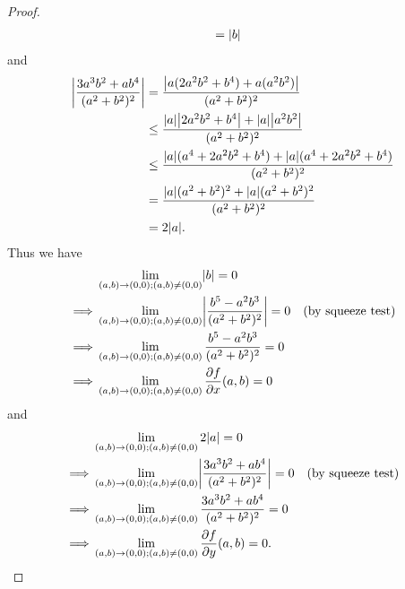 \begin{proof}
\begin{align*}
                                                  & = \left\lvert b\right\rvert
    \end{align*}
    and
    \begin{align*}
        \abs{\frac{3 a^3 b^2 + a b^4}{(a^2 + b^2)^2}} & = \frac{\abs{a (2 a^2 b^2 + b^4) + a (a^2 b^2)}}{(a^2 + b^2)^2}                              \\
                                                      & \leq \frac{\abs{a} \abs{2 a^2 b^2 + b^4} + \abs{a} \abs{a^2 b^2}}{(a^2 + b^2)^2}             \\
                                                      & \leq \frac{\abs{a} (a^4 + 2 a^2 b^2 + b^4) + \abs{a} (a^4 + 2 a^2 b^2 + b^4)}{(a^2 + b^2)^2} \\
                                                      & = \frac{\abs{a} (a^2 + b^2)^2 + \abs{a} (a^2 + b^2)^2}{(a^2 + b^2)^2}                        \\
                                                      & = 2 \abs{a}.
    \end{align*}
    Thus we have
    \begin{align*}
                 & \lim_{(a, b) \to (0, 0) ; (a, b) \neq (0, 0)} \abs{b} = 0                                                              \\
        \implies & \lim_{(a, b) \to (0, 0) ; (a, b) \neq (0, 0)} \abs{\frac{b^5 - a^2 b^3}{(a^2 + b^2)^2}} = 0 & \text{(by squeeze test)} \\
        \implies & \lim_{(a, b) \to (0, 0) ; (a, b) \neq (0, 0)} \frac{b^5 - a^2 b^3}{(a^2 + b^2)^2} = 0                                  \\
        \implies & \lim_{(a, b) \to (0, 0) ; (a, b) \neq (0, 0)} \frac{\partial f}{\partial x}(a, b) = 0
    \end{align*}
    and
    \begin{align*}
                 & \lim_{(a, b) \to (0, 0) ; (a, b) \neq (0, 0)} 2 \abs{a} = 0                                                                \\
        \implies & \lim_{(a, b) \to (0, 0) ; (a, b) \neq (0, 0)} \abs{\frac{3 a^3 b^2 + a b^4}{(a^2 + b^2)^2}} = 0 & \text{(by squeeze test)} \\
        \implies & \lim_{(a, b) \to (0, 0) ; (a, b) \neq (0, 0)} \frac{3 a^3 b^2 + a b^4}{(a^2 + b^2)^2} = 0                                  \\
        \implies & \lim_{(a, b) \to (0, 0) ; (a, b) \neq (0, 0)} \frac{\partial f}{\partial y}(a, b) = 0.
    \end{align*}

\end{proof}
